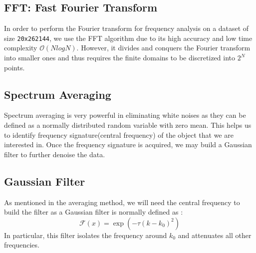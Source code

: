 \documentclass[11pt,a4paper]{article}
\numberwithin{equation}{subsection}
\begin{document}
	\subsection{FFT: Fast Fourier Transform}
	In order to perform the Fourier transform for frequency analysis on a dataset of size \texttt{20x262144}, we use the FFT algorithm due to its high accuracy and low time complexity $\mathcal{O}(N log N)$. However, it divides and conquers the Fourier transform into smaller ones\cite{fft_wiki} and thus requires the finite domains to be discretized into $2^N$ points.\cite{582notes}
	
	\subsection{Spectrum Averaging}
	Spectrum averaging is very powerful in eliminating white noises as they can be defined as a normally distributed random variable with zero mean\cite{582notes}. This helps us to identify frequency signature(central frequency) of the object that we are interested in. Once the frequency signature is acquired, we may build a Gaussian filter to further denoise the data.
	
	\subsection{Gaussian Filter}
	As mentioned in the averaging method, we will need the central frequency to build the filter as a Gaussian filter is normally defined as \cite{582notes}:
		\begin{equation}
		\mathcal{F}(x) = \exp (-\tau (k-k_0)^2)
		\end{equation}
	In particular, this filter isolates the frequency around $k_0$ and attenuates all other frequencies.
\end{document}
